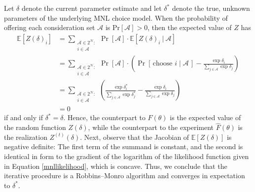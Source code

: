 \documentclass[preprint,12pt,authoryear]{elsarticle}
\begin{document}
Let $\delta$ denote the current parameter estimate and let $\delta^*$ denote the true, unknown parameters of the underlying MNL choice model. When the probability of offering each consideration set $\mathcal{A}$ is $\operatorname{Pr[\mathcal{A}]} > 0$, then the expected value of $Z$ has
\begin{align}
\mathbb{E}\left[Z(\delta)_i \right] &= \sum_{\substack{\mathcal{A} \in 2^{\mathcal{N}}: \\ i \in \mathcal{A}}}\operatorname{Pr}\left[\mathcal{A}\right] \cdot \mathbb{E}\left[Z(\delta)_i~|~\mathcal{A}\right] \\
&=   \sum_{\substack{\mathcal{A} \in 2^{\mathcal{N}}: \\ i \in \mathcal{A}}}\operatorname{Pr}\left[\mathcal{A}\right] \cdot \left(\operatorname{Pr}\left[\,\text{choose } i\;|\;\mathcal{A}\,\right] - \frac{\exp \delta_i}{\sum_{j\in \mathcal{A}} \exp \delta_j} \right) \\
&= \sum_{\substack{\mathcal{A} \in 2^{\mathcal{N}}: \\ i \in \mathcal{A}}}\left(\frac{\exp  \delta_i^*}{\sum_{j\in \mathcal{A}} \exp \delta_j^*} - \frac{\exp \delta_i}{\sum_{j\in \mathcal{A}} \exp \delta_j} \right) \\
&= 0
\end{align}
if and only if $\delta^* = \delta$. Hence, the counterpart to $F(\theta)$ is the expected value of the random function $Z(\delta)$, while the counterpart to the experiment $\hat F(\theta)$ is the realization $Z^{(t)}(\delta)$. Next, observe that the Jacobian of $\mathbb{E}\left[Z(\delta) \right]$ is negative definite: The first term of the summand is constant, and the second is identical in form to the gradient of the logarithm of the likelihood function given in Equation \eqref{mnllikelihood}, which is concave. Thus, we conclude that the iterative procedure is a Robbins--Monro algorithm and converges in expectation to $\delta^*$. 
\end{document}
